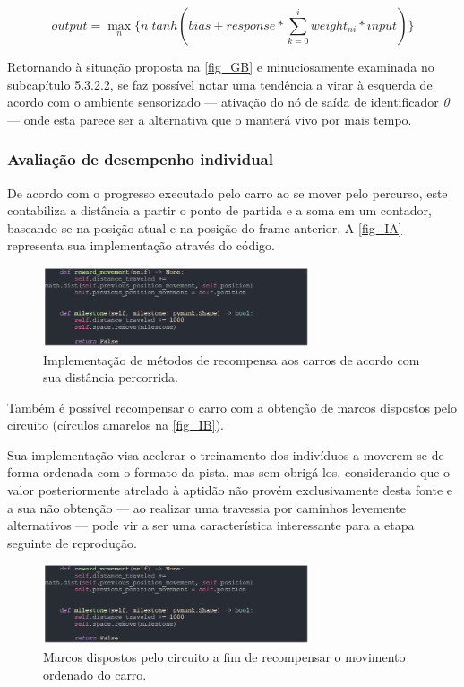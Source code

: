 \[ output = \max_{n}\{n | tanh(bias + response * \sum_{k=0}^{i} weight_{ni}*input)\} \]

Retornando à situação proposta na \autoref{fig_GB} e minuciosamente examinada no subcapítulo 5.3.2.2,
se faz possível notar uma tendência a virar à esquerda de acordo com o ambiente sensorizado —
ativação do nó de saída de identificador \textit{0} — onde esta parece ser a alternativa que o manterá vivo por mais tempo.

\subsubsection{Avaliação de desempenho individual}
De acordo com o progresso executado pelo carro ao se mover pelo percurso, este contabiliza a
distância a partir o ponto de partida e a soma em um contador, baseando-se na posição atual e na
posição do frame anterior. A \autoref{fig_IA} representa sua implementação através do código.

\begin{figure}[htb]
        \centering
        \caption{\label{fig_IA}Implementação de métodos de recompensa aos carros de acordo com sua distância percorrida.}
        \includegraphics[width=0.7\textwidth]{images/IA.png}
\end{figure}

Também é possível recompensar o carro com a obtenção de marcos dispostos pelo circuito (círculos amarelos na \autoref{fig_IB}). 

Sua implementação visa acelerar o treinamento dos indivíduos a moverem-se de forma ordenada com o
formato da pista, mas sem obrigá-los, considerando que o valor posteriormente atrelado à aptidão não
provém exclusivamente desta fonte e a sua não obtenção — ao realizar uma travessia por caminhos levemente
alternativos — pode vir a ser uma característica interessante para a etapa seguinte de reprodução.

\begin{figure}[htb]
        \centering
        \caption{\label{fig_IB}Marcos dispostos pelo circuito a fim de recompensar o movimento ordenado do carro.}
        \includegraphics[width=0.7\textwidth]{images/IB.png}
\end{figure}

